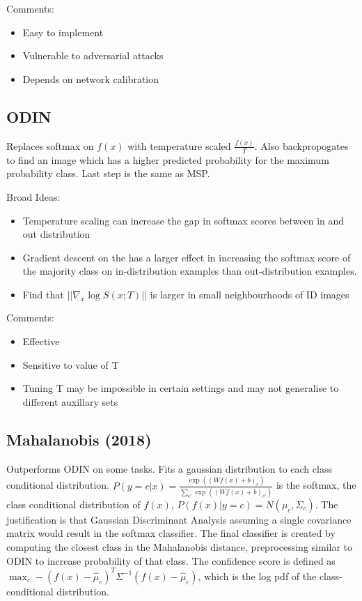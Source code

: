 \documentclass{article}
\providecommand{\norm}[1]{||#1||}
\begin{document}
            Comments:
            \begin{itemize}
                \item 
                    Easy to implement
                \item 
                    Vulnerable to adversarial attacks
                \item 
                    Depends on network calibration
            \end{itemize}
        
        \subsection{ODIN}
            Replaces softmax on $f(x)$ with temperature scaled $\frac{f(x)}{T}$. Also backpropogates to find an image which has a higher predicted probability for the maximum probability class. Last step is the same as MSP.
            
            Broad Ideas:
            \begin{itemize}
                \item 
                    Temperature scaling can increase the gap in softmax scores between in and out distribution
                \item 
                    Gradient descent on the has a larger effect in increasing the softmax score of the majority class on in-distribution examples than out-distribution examples. 
                \item 
                    Find that $\norm{\nabla_x \log S(x;T)}$ is larger in small neighbourhoods of ID images
            \end{itemize}
            
            Comments:
            \begin{itemize}
                \item 
                    Effective
                \item 
                    Sensitive to value of T
                \item 
                    Tuning T may be impossible in certain settings and may not generalise to different auxillary sets
            \end{itemize}

        \subsection{Mahalanobis (2018)}
            Outperforms ODIN on some tasks. Fits a gaussian distribution to each class conditional distribution. 
            $P(y = c| x) = \frac{\exp((Wf(x) + b)_c)}{\sum_{c'}\exp((Wf(x) + b)_{c'})}$ is the softmax, the class conditional distribution of $f(x)$, $P(f(x)|y = c) = N(\mu_c, \Sigma_c)$. The justification is that Gaussian Discriminant Analysis assuming a single covariance matrix would result in the softmax classifier. The final classifier is created by computing the closest class in the Mahalanobis distance, preprocessing similar to ODIN to increase probability of that class. The confidence score is defined as $\max_c - (f(x) - \hat{\mu}_c)^T\Sigma^{-1}(f(x) - \hat{\mu}_c)$, which is the log pdf of the class-conditional distribution.
            
\end{document}
